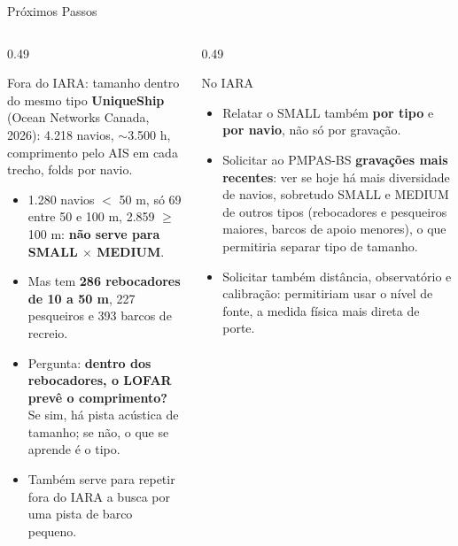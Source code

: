 \documentclass[aspectratio=169]{beamer}
\begin{document}
\begin{frame}{Próximos Passos}
    \footnotesize
    \begin{columns}[T]
        \begin{column}{0.49\textwidth}
            \begin{block}{\small Fora do IARA: tamanho dentro do mesmo tipo}
                \scriptsize
                \textbf{UniqueShip} (Ocean Networks Canada, 2026): 4.218 navios, $\sim$3.500 h, comprimento pelo AIS em cada trecho, folds por navio.
                \begin{itemize}
                    \setlength{\itemsep}{1pt}
                    \item 1.280 navios $<$ 50 m, só 69 entre 50 e 100 m, 2.859 $\geq$ 100 m: \textbf{não serve para SMALL $\times$ MEDIUM}.
                    \item Mas tem \textbf{286 rebocadores de 10 a 50 m}, 227 pesqueiros e 393 barcos de recreio.
                    \item Pergunta: \textbf{dentro dos rebocadores, o LOFAR prevê o comprimento?} Se sim, há pista acústica de tamanho; se não, o que se aprende é o tipo.
                    \item Também serve para repetir fora do IARA a busca por uma pista de barco pequeno.
                \end{itemize}
            \end{block}
        \end{column}
        \begin{column}{0.49\textwidth}
            \begin{block}{\small No IARA}
                \scriptsize
                \begin{itemize}
                    \setlength{\itemsep}{1pt}
                    \item Relatar o SMALL também \textbf{por tipo} e \textbf{por navio}, não só por gravação.
                    \item Solicitar ao PMPAS-BS \textbf{gravações mais recentes}: ver se hoje há mais diversidade de navios, sobretudo SMALL e MEDIUM de outros tipos (rebocadores e pesqueiros maiores, barcos de apoio menores), o que permitiria separar tipo de tamanho.
                    \item Solicitar também distância, observatório e calibração: permitiriam usar o nível de fonte, a medida física mais direta de porte.
                \end{itemize}
            \end{block}
        \end{column}
    \end{columns}
\end{frame}
\end{document}
